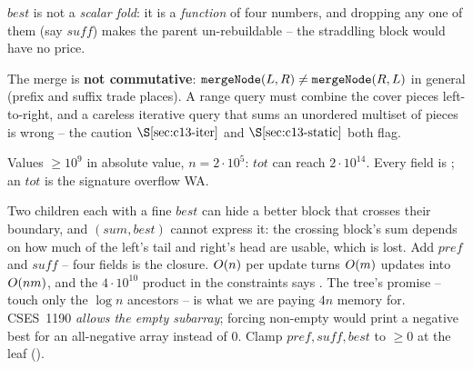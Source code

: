 \begin{observation}
\(\mathit{best}\) is not a \emph{scalar fold}: it is a \emph{function} of four
numbers, and dropping any one of them (say \(\mathit{suff}\)) makes the parent
un-rebuildable -- the straddling block would have no price.
\end{observation}
\begin{observation}
The merge is \textbf{not commutative}: \(\texttt{mergeNode}(L,R)\ne
\texttt{mergeNode}(R,L)\) in general (prefix and suffix trade places).  A range
query must combine the cover pieces left-to-right, and a careless iterative
query that sums an unordered multiset of pieces is wrong -- the caution
\(\secref{c13-iter}\) and \(\secref{c13-static}\) both flag.
\end{observation}
\begin{observation}
Values \(\ge 10^9\) in absolute value, \(n=2\cdot10^5\): \(\mathit{tot}\) can
reach \(2\cdot10^{14}\).  Every field is ; an 
\(\mathit{tot}\) is the signature overflow WA.
\end{observation}

\begin{thinkbox}
{Two children each with a fine \(\mathit{best}\) can hide a better block that
crosses their boundary, and \((\mathit{sum},\mathit{best})\) cannot express it:
the crossing block's sum depends on how much of the left's tail and right's head
are usable, which is lost.  Add \(\mathit{pref}\) and \(\mathit{suff}\) -- four
fields is the closure.}
{\(O(n)\) per update turns \(O(m)\) updates into \(O(nm)\), and the
\(4\cdot10^{10}\) product in the constraints says \tle.  The tree's promise --
touch only the \(\log n\) ancestors -- is what we are paying \(4n\) memory for.}
{CSES~1190 \emph{allows the empty subarray}; forcing non-empty would print a
negative best for an all-negative array instead of \(0\).  Clamp
\(\mathit{pref},\mathit{suff},\mathit{best}\) to \(\ge0\) at the leaf
().}
\end{thinkbox}

